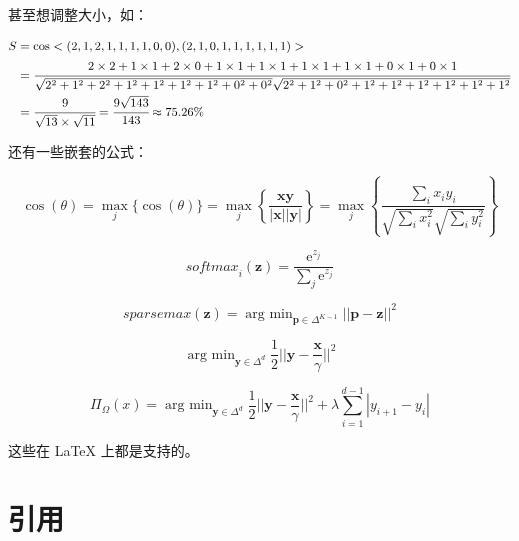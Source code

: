 \documentclass[14pt]{jnuthesis}
\begin{document}
甚至想调整大小，如：

\begin{equation*}
	\small
	\begin{aligned}
		S & = \cos<(2, 1, 2, 1, 1, 1, 1, 0, 0), (2, 1, 0, 1, 1, 1, 1, 1, 1)>  \\
		 & = \cfrac{2 \times 2 + 1 \times 1 + 2 \times 0 + 1 \times 1 + 1 \times 1 + 1 \times 1 + 1 \times 1 + 0 \times 1 + 0 \times 1}{\sqrt{2^2 + 1^2 + 2^2 + 1^2 + 1^2 + 1^2 + 1^2 + 0^2 + 0^2}\sqrt{2^2 + 1^2 + 0^2 + 1^2 + 1^2 + 1^2 + 1^2 + 1^2 + 1^2}}  \\
		 & = \cfrac{9}{\sqrt{13} \times \sqrt{11}} = \cfrac{9\sqrt{143}}{143} \approx 75.26\%
	\end{aligned}
\end{equation*}

还有一些嵌套的公式：

\begin{equation*}
	\cos(\theta) = \mathop{\max}_j\{\cos(\theta)\} = \mathop{\max}_j\left\{\frac{\bm{x}\bm{y}}{|\bm{x}||\bm{y}|}\right\} = \mathop{\max}_j\left\{\frac{\mathop{\sum}_i x_i y_i}{\sqrt{\mathop{\sum}_i x_i^2}\sqrt{\mathop{\sum}_i y_i^2}}\right\}
\end{equation*}

\begin{equation*}
	\textit{softmax}_i(\bm{z}) = \frac{\text{e}^{z_j}}{\mathop{\sum}_j\text{e}^{z_j}}
\end{equation*}

\begin{equation*}
	\textit{sparsemax}(\bm{z}) = \mathop{\mathrm{arg} \text{ } \min}_{\bm{p}\in\Delta^{K - 1}}||\bm{p} - \bm{z}||^2
\end{equation*}

\begin{equation*}
	\mathop{\mathrm{arg} \text{ } \min}_{\bm{y}\in\Delta^d}\frac{1}{2}\bigg|\bigg|\bm{y} - \frac{\bm{x}}{\gamma}\bigg|\bigg|^2
\end{equation*}

\begin{equation*}
	\Pi_\Omega(x) = \mathop{\mathrm{arg} \text{ } \min}_{\bm{y}\in\Delta^d}\frac{1}{2}\bigg|\bigg|\bm{y} - \frac{\bm{x}}{\gamma}\bigg|\bigg|^2 + \lambda\mathop{\sum}_{i = 1}^{d - 1}|y_{i + 1} - y_i|
\end{equation*}

这些在 LaTeX 上都是支持的。

\section{引用}
\end{document}
